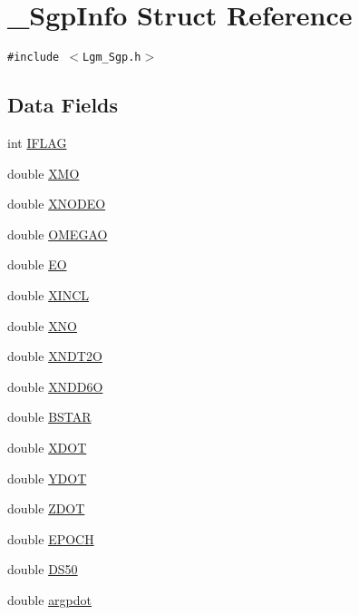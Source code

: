 \hypertarget{struct___sgp_info}{
\section{\_\-SgpInfo Struct Reference}
\label{struct___sgp_info}
}
{\tt \#include $<$Lgm\_\-Sgp.h$>$}

\subsection*{Data Fields}
\begin{CompactItemize}
\item 
int \hyperlink{struct___sgp_info_686aa728d7bead181dc3ac3a0832502f}{IFLAG}
\item 
double \hyperlink{struct___sgp_info_b8bbf06d285fc56edffbc353b8e1acf6}{XMO}
\item 
double \hyperlink{struct___sgp_info_19011c821f658fe3d9eb170b9a7d505d}{XNODEO}
\item 
double \hyperlink{struct___sgp_info_06f0e6ec3e46d144a3fc90417308816e}{OMEGAO}
\item 
double \hyperlink{struct___sgp_info_c3b3a39803395c18d0919adaef671344}{EO}
\item 
double \hyperlink{struct___sgp_info_f3ee830bb3dfcd5873b48ac804fcfcfc}{XINCL}
\item 
double \hyperlink{struct___sgp_info_3a911c89d654142a00f0502b3ff5ccae}{XNO}
\item 
double \hyperlink{struct___sgp_info_524a63b4890023f57824dbd323fa4bc8}{XNDT2O}
\item 
double \hyperlink{struct___sgp_info_317e80d6b4bbe1395b92c56947740716}{XNDD6O}
\item 
double \hyperlink{struct___sgp_info_44e631843bf304236d4a37d7ce0ef549}{BSTAR}
\item 
double \hyperlink{struct___sgp_info_3c2788a0eb0527cf6b39bf2efcedc9d8}{XDOT}
\item 
double \hyperlink{struct___sgp_info_63b51d09dc1b7c17d7822ecf0276c303}{YDOT}
\item 
double \hyperlink{struct___sgp_info_0113995221a55c2a324a49b992c3e83e}{ZDOT}
\item 
double \hyperlink{struct___sgp_info_096845c6ff00da184a48b51ea1efde49}{EPOCH}
\item 
double \hyperlink{struct___sgp_info_105c57f6cb86a5a9c93a1454db061841}{DS50}
\item 
double \hyperlink{struct___sgp_info_c9dd4d43db3b68465f53fd7841f2cb96}{argpdot}
\item 

\end{CompactItemize}
